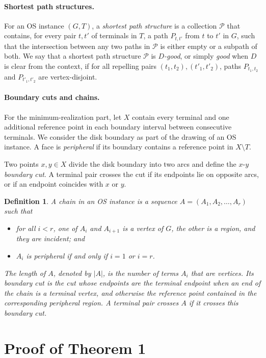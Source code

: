 \documentclass[11pt]{article}
\newtheorem{definition}[theorem]{Definition}
\newcommand{\pset}{{\mathcal{P}}}
\begin{document}
\paragraph{Shortest path structures.}
For an OS instance $(G,T)$, a \emph{shortest path structure} is a collection $\pset$ that contains, for every pair $t,t'$ of terminals in $T$, a path $P_{t,t'}$ from $t$ to $t'$ in $G$, such that the intersection between any two paths in $\pset$ is either empty or a subpath of both. We say that a shortest path structure $\pset$ is \emph{$D$-good}, or simply \emph{good} when $D$ is clear from the context, if for all repelling pairs $(t_1,t_2),(t'_1,t'_2)$, paths $P_{t_1,t_2}$ and $P_{t'_1,t'_2}$ are vertex-disjoint.

\paragraph{Boundary cuts and chains.}
For the minimum-realization part, let $X$ contain every terminal and one additional reference point in each boundary interval between consecutive terminals. We consider the disk boundary as part of the drawing of an OS instance. A face is \emph{peripheral} if its boundary contains a reference point in $X\setminus T$.

Two points $x,y\in X$ divide the disk boundary into two arcs and define the $x$-$y$ \emph{boundary cut}. A terminal pair crosses the cut if its endpoints lie on opposite arcs, or if an endpoint coincides with $x$ or $y$.

\begin{definition}\label{def:chains}
A \emph{chain} in an OS instance is a sequence $A=(A_1,A_2,\ldots,A_r)$ such that
\begin{itemize}
\item for all $i<r$, one of $A_i$ and $A_{i+1}$ is a vertex of $G$, the other is a region, and they are incident; and
\item $A_i$ is peripheral if and only if $i=1$ or $i=r$.
\end{itemize}
The length of $A$, denoted by $|A|$, is the number of terms $A_i$ that are vertices. Its boundary cut is the cut whose endpoints are the terminal endpoint when an end of the chain is a terminal vertex, and otherwise the reference point contained in the corresponding peripheral region. A terminal pair crosses $A$ if it crosses this boundary cut.
\end{definition}

\section{Proof of Theorem 1}
\label{sec: repelling paths}
\end{document}
